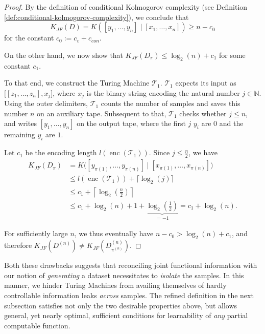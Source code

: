 \begin{proof}
	By the definition of conditional Kolmogorov complexity (see Definition \ref{def:conditional-kolmogorov-complexity}), we conclude that
	\begin{equation}
		K_{JF}(D)=K([y_1,\dots,y_n]\mid [x_1,\dots,x_n])\geq n-c_0
	\end{equation}  
	for the constant $c_0:=c_v+c_{con}$.
	
	On the other hand, we now show that $K_{JF}(D_{\pi})\leq \log_2(n)+c_1$ for some constant $c_1$.
	
	To that end, we construct the Turing Machine $\mathcal{T}_1$.
	$\mathcal{T}_1$ expects its input as $\bigl[[z_1,\dots,z_n],x_j\bigr]$, where $x_j$ is the binary string encoding the natural number $j\in\mathbb{N}$.
	Using the outer delimiters, $\mathcal{T}_1$ counts the number of samples and saves this number $n$ on an auxiliary tape.
	Subsequent to that, $\mathcal{T}_1$ checks whether $j\leq n$, and writes $[y_1,\dots,y_n]$ on the output tape, where the first $j$ $y_i$ are $0$ and the remaining $y_i$ are $1$.
	
	Let $c_1$ be the encoding length $l(\operatorname{enc}(\mathcal{T}_1))$.
	Since $j\leq \frac{n}{2}$, we have 
	\begin{align}
		K_{JF}(D_{\pi})&=K\bigl([y_{\pi(1)},\dots,y_{\pi(n)}]\mid [x_{\pi(1)},\dots,x_{\pi(n)}]\bigr) \\
		&\leq l(\operatorname{enc}(\mathcal{T}_1)) + \lceil \log_2(j)\rceil \\
		&\leq c_1 +  \left\lceil\log_2\left(\frac{n}{2}\right)\right\rceil \\
		& \leq c_1 + \log_2(n) + 1 + \underbrace{\log_2\left(\frac{1}{2}\right)}_{=-1} = c_1 + \log_2(n).
	\end{align}
	
	For sufficiently large $n$, we thus eventually have $n-c_0>\log_2(n)+c_1$, and therefore $K_{JF}(D^{(n)})\neq K_{JF}(D^{(n)}_{\pi^{(n)}})$.
\end{proof}

Both these drawbacks suggests that reconciling joint functional information with our notion of \textit{generating} a dataset necessitates to \textit{isolate} the samples.
In this manner, we hinder Turing Machines from availing themselves of hardly controllable information leaks \textit{across} samples.
The refined definition in the next subsection satisfies not only the two desirable properties above, but allows general, yet nearly optimal, sufficient conditions for learnability of \textit{any} partial computable function.

